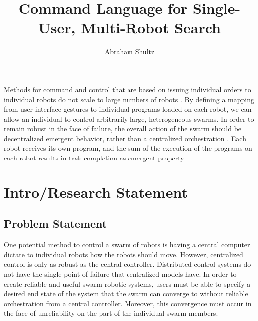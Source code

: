 \documentclass[]{article}
\title{Command Language for Single-User, Multi-Robot Search}
\author{Abraham Shultz}
\begin{document}
\maketitle

\begin{abstract}

\end{abstract}

Methods for command and control that are based on issuing individual orders to individual robots do not scale to large numbers of robots . 
By defining a mapping from user interface gestures to individual programs loaded on each robot, we can allow an individual to control arbitrarily large, heterogeneous swarms.
In order to remain robust in the face of failure, the overall action of the swarm should be decentralized emergent behavior, rather than a centralized orchestration . 
Each robot receives its own program, and the sum of the execution of the programs on each robot results in task completion as emergent property.

\section{Intro/Research Statement}

\subsection{Problem Statement}

One potential method to control a swarm of robots is having a central computer dictate to individual robots how the robots should move.
However, centralized control is only as robust as the central controller. 
Distributed control systems do not have the single point of failure that centralized models have. 
In order to create reliable and useful swarm robotic systems, users must be able to specify a desired end state of the system that the swarm can converge to without reliable orchestration from a central controller. 
Moreover, this convergence must occur in the face of unreliability on the part of the individual swarm members. 
\end{document}
